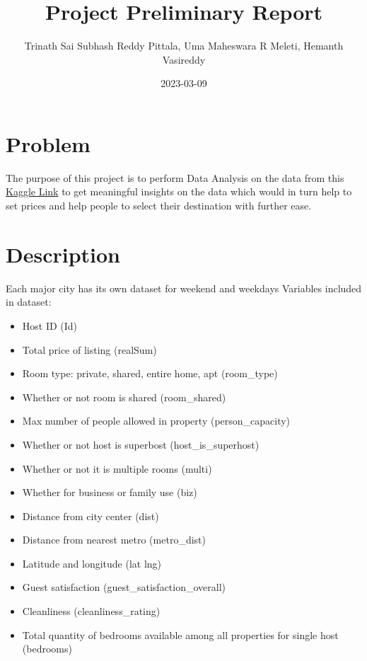 \documentclass[
]{article}
\title{Project Preliminary Report}
\author{Trinath Sai Subhash Reddy Pittala, Uma Maheswara R Meleti,
Hemanth Vasireddy}
\date{2023-03-09}
\providecommand{\tightlist}{%
  \setlength{\itemsep}{0pt}\setlength{\parskip}{0pt}}
\begin{document}
\maketitle

\hypertarget{problem}{%
\section{Problem}\label{problem}}

The purpose of this project is to perform Data Analysis on the data from
this
\href{https://www.kaggle.com/datasets/thedevastator/airbnb-price-determinants-in-europe}{Kaggle
Link} to get meaningful insights on the data which would in turn help to
set prices and help people to select their destination with further
ease.

\hypertarget{description}{%
\section{Description}\label{description}}

Each major city has its own dataset for weekend and weekdays Variables
included in dataset:

\begin{itemize}
\tightlist
\item
  Host ID (Id)
\item
  Total price of listing (realSum)
\item
  Room type: private, shared, entire home, apt (room\_type)
\item
  Whether or not room is shared (room\_shared)
\item
  Max number of people allowed in property (person\_capacity)
\item
  Whether or not host is superbost (host\_is\_superhost)
\item
  Whether or not it is multiple rooms (multi)
\item
  Whether for business or family use (biz)
\item
  Distance from city center (dist)
\item
  Distance from nearest metro (metro\_dist)
\item
  Latitude and longitude (lat lng)
\item
  Guest satisfaction (guest\_satisfaction\_overall)
\item
  Cleanliness (cleanliness\_rating)
\item
  Total quantity of bedrooms available among all properties for single
  host (bedrooms)
\end{itemize}
\end{document}
